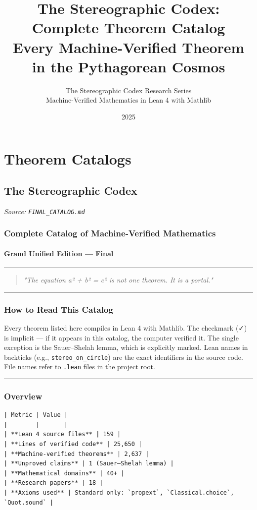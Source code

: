 \documentclass[12pt,a4paper,openany]{book}
\title{\Huge\textbf{The Stereographic Codex: Complete Theorem Catalog}\\[1em]\Large Every Machine-Verified Theorem in the Pythagorean Cosmos}
\author{The Stereographic Codex Research Series\\Machine-Verified Mathematics in Lean 4 with Mathlib}
\date{2025}
\begin{document}
\maketitle
\tableofcontents
\newpage


\part{Theorem Catalogs}
\textit{}


\chapter{The Stereographic Codex}
\textit{Source: \texttt{FINAL\_CATALOG.md}}


\section{Complete Catalog of Machine-Verified Mathematics}

\subsection{Grand Unified Edition — Final}

\bigskip\hrule\bigskip

\begin{quote}\textit{\textit{"The equation a² + b² = c² is not one theorem. It is a portal."}}\end{quote}

\bigskip\hrule\bigskip

\section{How to Read This Catalog}

Every theorem listed here compiles in Lean 4 with Mathlib. The checkmark (✓) is implicit — if it appears in this catalog, the computer verified it. The single exception is the Sauer–Shelah lemma, which is explicitly marked. Lean names in backticks (e.g., \texttt{stereo\_on\_circle}) are the exact identifiers in the source code. File names refer to \texttt{.lean} files in the project root.

\bigskip\hrule\bigskip

\section{Overview}

\begin{verbatim}
| Metric | Value |
|--------|-------|
| **Lean 4 source files** | 159 |
| **Lines of verified code** | 25,650 |
| **Machine-verified theorems** | 2,637 |
| **Unproved claims** | 1 (Sauer–Shelah lemma) |
| **Mathematical domains** | 40+ |
| **Research papers** | 18 |
| **Axioms used** | Standard only: `propext`, `Classical.choice`, `Quot.sound` |
\end{verbatim}
\end{document}
